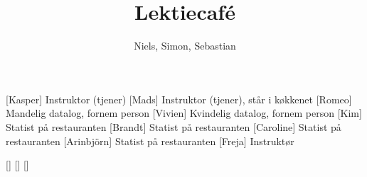 \documentclass[a4paper,11pt]{article}
\title{Lektiecafé}
\author{Niels, Simon, Sebastian}
\begin{document}
\maketitle

\begin{roles}
[Kasper] Instruktor (tjener)
[Mads] Instruktor (tjener), står i køkkenet
[Romeo] Mandelig datalog, fornem person
[Vivien] Kvindelig datalog, fornem person
[Kim] Statist på restauranten
[Brandt] Statist på restauranten
[Caroline] Statist på restauranten
[Arinbjörn] Statist på restauranten
[Freja] Instruktør
\end{roles}

\begin{props}
[]
[]
[]
\end{props}
\end{document}
